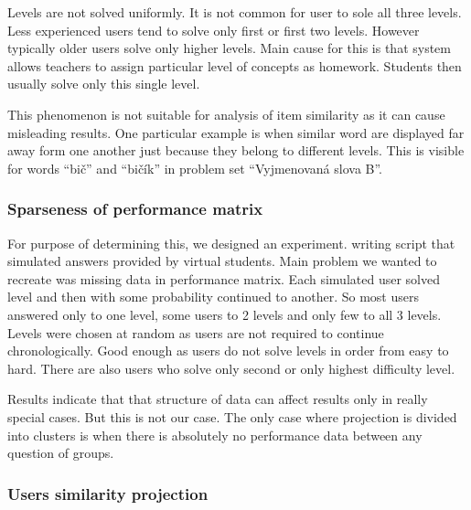 \documentclass[
  digital, %
  table,   %
  nolof,     %
  nolot,     %
  nocover
]{fithesis3}
\begin{document}

Levels are not solved uniformly. It is not common for user to sole all
three levels. Less experienced users tend to solve only first or first
two levels. However typically older users solve only higher levels. Main
cause for this is that system allows teachers to assign particular level
of concepts as homework. Students then usually solve only this single
level.



This phenomenon is not suitable for analysis of item similarity as it
can cause misleading results. One particular example is when similar
word are displayed far away form one another just because they belong to
different levels. This is visible for words ``bič'' and ``bičík'' in
problem set ``Vyjmenovaná slova B''.

\subsubsection{Sparseness of performance
matrix}\label{sparseness-of-performance-matrix}



For purpose of determining this, we designed an experiment. writing
script that simulated answers provided by virtual students. Main problem
we wanted to recreate was missing data in performance matrix. Each
simulated user solved level and then with some probability continued to
another. So most users answered only to one level, some users to 2
levels and only few to all 3 levels. Levels were chosen at random as
users are not required to continue chronologically. Good enough as users
do not solve levels in order from easy to hard. There are also users who
solve only second or only highest difficulty level.

Results indicate that that structure of data can affect results only in
really special cases. But this is not our case. The only case where
projection is divided into clusters is when there is absolutely no
performance data between any question of groups.

\subsubsection{Users similarity
projection}\label{users-similarity-projection}
\end{document}
